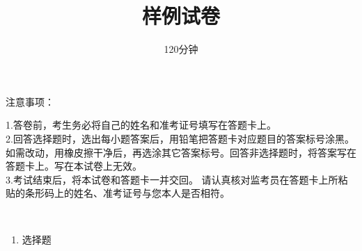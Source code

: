 \documentclass[addpoints,answers]{exam}
\title{样例试卷}
\author{120分钟}
\date{}
\begin{document}
\maketitle
{\heiti 注意事项}：
\begin{enumerate}
1.答卷前，考生务必将自己的姓名和准考证号填写在答题卡上。\\
2.回答选择题时，选出每小题答案后，用铅笔把答题卡对应题目的答案标号涂黑。如需改动，用橡皮擦干净后，再选涂其它答案标号。回答非选择题时，将答案写在答题卡上。写在本试卷上无效。\\
3.考试结束后，将本试卷和答题卡一并交回。
	请认真核对监考员在答题卡上所粘贴的条形码上的姓名、准考证号与您本人是否相符。
\end{enumerate}
\\

\begin{enumerate}[label={\chinese*、},labelsep=0pt]
\item 选择题

\end{enumerate}
\end{document}

